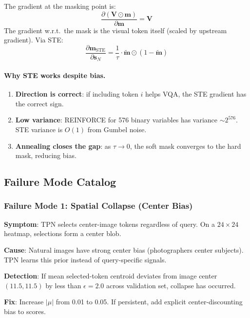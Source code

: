 \documentclass[11pt,a4paper]{article}
\newcommand{\vm}{\mathbf{m}}
\newcommand{\vs}{\mathbf{s}}
\newcommand{\mV}{\mathbf{V}}
\begin{document}
The gradient at the masking point is:
\begin{equation}
  \frac{\partial (\mV \odot \vm)}{\partial \vm} = \mV
\end{equation}
The gradient w.r.t.\ the mask is the visual token itself (scaled by upstream
gradient). Via STE:
\begin{equation}
  \frac{\partial \vm_{\text{STE}}}{\partial \vs_N}
    = \frac{1}{\tau} \cdot \tilde{\vm} \odot (1 - \tilde{\vm})
\end{equation}

\paragraph{Why STE works despite bias.}
\begin{enumerate}[leftmargin=1.5em, itemsep=1pt]
  \item \textbf{Direction is correct}: if including token $i$ helps VQA,
    the STE gradient has the correct sign.
  \item \textbf{Low variance}: REINFORCE for 576 binary variables has
    variance $\sim\!2^{576}$. STE variance is $O(1)$ from Gumbel noise.
  \item \textbf{Annealing closes the gap}: as $\tau \to 0$, the soft mask
    converges to the hard mask, reducing bias.
\end{enumerate}

\subsection{Failure Mode Catalog}

\subsubsection{Failure Mode 1: Spatial Collapse (Center Bias)}

\begin{warnbox}[title={Spatial Collapse}]
\textbf{Symptom}: TPN selects center-image tokens regardless of query.
On a $24 \times 24$ heatmap, selections form a center blob.

\textbf{Cause}: Natural images have strong center bias (photographers center
subjects). TPN learns this prior instead of query-specific signals.

\textbf{Detection}: If mean selected-token centroid deviates from image
center $(11.5, 11.5)$ by less than $\epsilon = 2.0$ across validation set,
collapse has occurred.

\textbf{Fix}: Increase $|\mu|$ from 0.01 to 0.05. If persistent, add
explicit center-discounting bias to scores.
\end{warnbox}
\end{document}
